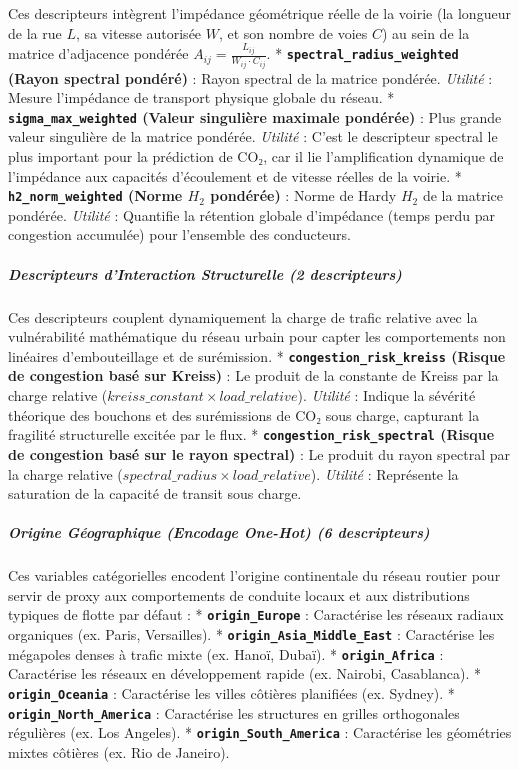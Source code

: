 \documentclass[10pt, a4paper]{article}
\begin{document}
Ces descripteurs intègrent l'impédance géométrique réelle de la voirie
(la longueur de la rue \(L\), sa vitesse autorisée \(W\), et son nombre
de voies \(C\)) au sein de la matrice d'adjacence pondérée
\(A_{ij} = \frac{L_{ij}}{W_{ij} \cdot C_{ij}}\). *
\textbf{\texttt{spectral\_radius\_weighted} (Rayon spectral pondéré)} :
Rayon spectral de la matrice pondérée. \emph{Utilité} : Mesure
l'impédance de transport physique globale du réseau. *
\textbf{\texttt{sigma\_max\_weighted} (Valeur singulière maximale
pondérée)} : Plus grande valeur singulière de la matrice pondérée.
\emph{Utilité} : C'est le descripteur spectral le plus important pour la
prédiction de CO₂, car il lie l'amplification dynamique de l'impédance
aux capacités d'écoulement et de vitesse réelles de la voirie. *
\textbf{\texttt{h2\_norm\_weighted} (Norme \(H_2\) pondérée)} : Norme de
Hardy \(H_2\) de la matrice pondérée. \emph{Utilité} : Quantifie la
rétention globale d'impédance (temps perdu par congestion accumulée)
pour l'ensemble des conducteurs.

\subparagraph{Descripteurs d'Interaction Structurelle (2
descripteurs)}\label{descripteurs-dinteraction-structurelle-2-descripteurs}

Ces descripteurs couplent dynamiquement la charge de trafic relative
avec la vulnérabilité mathématique du réseau urbain pour capter les
comportements non linéaires d'embouteillage et de surémission. *
\textbf{\texttt{congestion\_risk\_kreiss} (Risque de congestion basé sur
Kreiss)} : Le produit de la constante de Kreiss par la charge relative
(\(kreiss\_constant \times load\_relative\)). \emph{Utilité} : Indique
la sévérité théorique des bouchons et des surémissions de CO₂ sous
charge, capturant la fragilité structurelle excitée par le flux. *
\textbf{\texttt{congestion\_risk\_spectral} (Risque de congestion basé
sur le rayon spectral)} : Le produit du rayon spectral par la charge
relative (\(spectral\_radius \times load\_relative\)). \emph{Utilité} :
Représente la saturation de la capacité de transit sous charge.

\subparagraph{Origine Géographique (Encodage One-Hot) (6
descripteurs)}\label{origine-guxe9ographique-encodage-one-hot-6-descripteurs}

Ces variables catégorielles encodent l'origine continentale du réseau
routier pour servir de proxy aux comportements de conduite locaux et aux
distributions typiques de flotte par défaut : *
\textbf{\texttt{origin\_Europe}} : Caractérise les réseaux radiaux
organiques (ex. Paris, Versailles). *
\textbf{\texttt{origin\_Asia\_Middle\_East}} : Caractérise les mégapoles
denses à trafic mixte (ex. Hanoï, Dubaï). *
\textbf{\texttt{origin\_Africa}} : Caractérise les réseaux en
développement rapide (ex. Nairobi, Casablanca). *
\textbf{\texttt{origin\_Oceania}} : Caractérise les villes côtières
planifiées (ex. Sydney). * \textbf{\texttt{origin\_North\_America}} :
Caractérise les structures en grilles orthogonales régulières (ex. Los
Angeles). * \textbf{\texttt{origin\_South\_America}} : Caractérise les
géométries mixtes côtières (ex. Rio de Janeiro).
\end{document}
